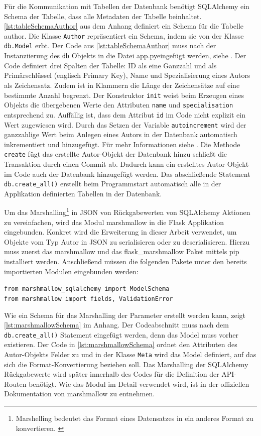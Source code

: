 \documentclass[a4paper,titlepage,halfparskip,12pt,listof=numbered]{scrreprt}
\begin{document}
\begin{onehalfspacing}
Für die Kommunikation mit Tabellen der Datenbank benötigt SQLAlchemy ein Schema der Tabelle, dass alle Metadaten der Tabelle beinhaltet\cite[S.31]{pythonFlaskREST}. \autoref{lst:tableSchemaAuthor} aus dem Anhang definiert ein Schema für die Tabelle \glqq author\grqq. Die Klasse \texttt{Author} repräsentiert ein Schema, indem sie von der Klasse \texttt{db.Model} erbt. Der Code aus \autoref{lst:tableSchemaAuthor} muss nach der Instanziierung des \texttt{db} Objekts in die Datei  \glqq app.py\grqq eingefügt werden, siehe \cite[S.33]{pythonFlaskREST}. Der Code definiert drei Spalten der Tabelle: ID als eine Ganzzahl und als Primärschlüssel (englisch Primary Key), Name und Spezialisierung eines Autors als Zeichensatz. Zudem ist in Klammern die Länge der Zeichensätze auf eine bestimmte Anzahl begrenzt. Der Konstruktor \texttt{init} weist beim Erzeugen eines Objekts die übergebenen Werte den Attributen \texttt{name} und \texttt{specialisation} entsprechend zu. Auffällig ist, dass dem Attribut \texttt{id} im Code nicht explizit ein Wert zugewiesen wird. Durch das Setzen der Variable \texttt{autoincrement} wird der ganzzahlige Wert beim Anlegen eines Autors in der Datenbank automatisch inkrementiert und hinzugefügt. Für mehr Informationen siehe \cite{autoincrementSQLAlchemy}. Die Methode \texttt{create} fügt das erstellte Autor-Objekt der Datenbank hinzu schließt die Transaktion durch einen Commit ab. Dadurch kann ein erstelltes Autor-Objekt im Code auch der Datenbank hinzugefügt werden. Das abschließende Statement \texttt{db.create\_all()} erstellt beim Programmstart automatisch alle in der Applikation definierten Tabellen in der Datenbank.\cite[S.33ff.]{pythonFlaskREST}

Um das Marshalling\footnote{Marshelling bedeutet das Format eines Datensatzes in ein anderes Format zu konvertieren. \cite[S.36]{richterArchitekturVS}} in \ac{JSON} von Rückgabewerten von SQLAlchemy Aktionen zu vereinfachen, wird das Modul marshmallow in die Flask Applikation eingebunden. Konkret wird die Erweiterung in dieser Arbeit verwendet, um Objekte vom Typ Autor in \ac{JSON} zu serialisieren oder zu deserialisieren. Hierzu muss zuerst das marshmallow und das flask\_marshmallow Paket mittels pip installiert werden. Anschließend müssen die folgenden Pakete unter den bereits importierten Modulen eingebunden werden:

\texttt{from marshmallow\_sqlalchemy import ModelSchema}\\
\texttt{from marshmallow import fields, ValidationError}

Wie ein Schema für das Marshalling der Parameter erstellt werden kann, zeigt \autoref{lst:marshmallowSchema} im Anhang. Der Codeabschnitt muss nach dem \texttt{db.create\_all()} Statement eingefügt werden, denn das Model muss vorher existieren. Der Code in \autoref{lst:marshmallowSchema} ordnet den Attributen des Autor-Objekts Felder zu und in der Klasse \texttt{Meta} wird das Model definiert, auf das sich die Format-Konvertierung beziehen soll. Das Marshalling der SQLAlchemy Rückgabewerte wird später innerhalb des Codes für die Definition der \ac{API}-Routen benötigt. Wie das Modul im Detail verwendet wird, ist in der offiziellen Dokumentation von marshmallow \cite{marshmallowQuickstart} zu entnehmen.


\end{onehalfspacing}
\end{document}
